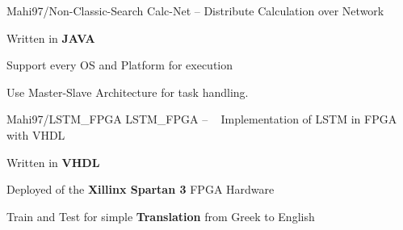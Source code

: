 \begin{cventries}
    
    \cventry
    {Mahi97/Non-Classic-Search} %
    {Calc-Net -- Distribute Calculation over Network} %
    {} %
    {} %
    {
      \begin{cvitems} %
         \item {Written in \textbf{JAVA}}
        \item {Support every OS and Platform for execution}
        \item {Use Master-Slave Architecture for task handling.}
      \end{cvitems}
    }

    \cventry
    {Mahi97/LSTM\_FPGA} %
    {LSTM\_FPGA -- ~ Implementation of LSTM in FPGA with VHDL} %
    {} %
    {} %
    {
      \begin{cvitems} %
        \item {Written in \textbf{VHDL}}
        \item {Deployed of the \textbf{Xillinx Spartan 3} FPGA Hardware}
        \item {Train and Test for simple \textbf{Translation} from Greek to English}
      \end{cvitems}
    }



\end{cventries}
